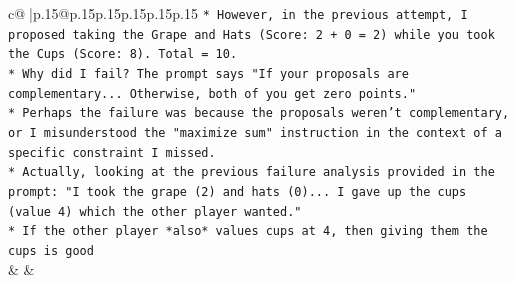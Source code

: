 \documentclass{article}
\begin{document}
{\begin{supertabular}{c@{$\;$}|p{.15\linewidth}@{}p{.15\linewidth}p{.15\linewidth}p{.15\linewidth}p{.15\linewidth}p{.15\linewidth}}
{{{\texttt{*   However, in the previous attempt, I proposed taking the Grape and Hats (Score: 2 + 0 = 2) while you took the Cups (Score: 8). Total = 10.} \\
\texttt{*   Why did I fail? The prompt says "If your proposals are complementary... Otherwise, both of you get zero points."} \\
\texttt{*   Perhaps the failure was because the proposals weren't complementary, or I misunderstood the "maximize sum" instruction in the context of a specific constraint I missed.} \\
\texttt{*   Actually, looking at the previous failure analysis provided in the prompt: "I took the grape (2) and hats (0)... I gave up the cups (value 4) which the other player wanted."} \\
\texttt{*   If the other player *also* values cups at 4, then giving them the cups is good} \\
            }
        }
    }
    & & \\ \\


\end{supertabular}}
\end{document}
